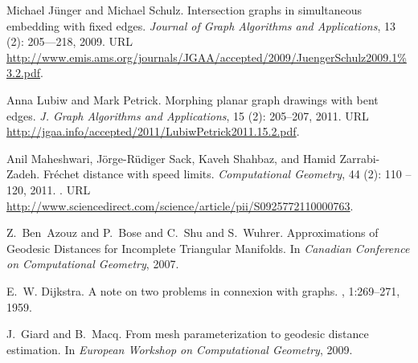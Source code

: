 \documentclass{patmorin}
\begin{document}
\begin{thebibliography}{1}
Michael J{\"u}nger and Michael Schulz.
\newblock Intersection graphs in simultaneous embedding with fixed edges.
\newblock \emph{Journal of Graph Algorithms and Applications}, 13
  (2): 205---218, 2009.
\newblock URL
  \url{http://www.emis.ams.org/journals/JGAA/accepted/2009/JuengerSchulz2009.1%
3.2.pdf}.

Anna Lubiw and Mark Petrick.
\newblock Morphing planar graph drawings with bent edges.
\newblock \emph{J. Graph Algorithms and Applications}, 15
  (2): 205--207, 2011.
\newblock URL \url{http://jgaa.info/accepted/2011/LubiwPetrick2011.15.2.pdf}.

Anil Maheshwari, J{\"o}rge-R{\"u}diger Sack, Kaveh Shahbaz, and Hamid
  Zarrabi-Zadeh.
\newblock Fr\'echet distance with speed limits.
\newblock \emph{Computational Geometry}, 44 (2): 110 -- 120,
  2011.
\newblock {}.
\newblock URL
  \url{http://www.sciencedirect.com/science/article/pii/S0925772110000763}.


Z.~Ben~Azouz and P.~Bose and C.~Shu and S.~Wuhrer.
\newblock Approximations of Geodesic Distances for Incomplete Triangular Manifolds.
\newblock In {\em Canadian Conference on Computational Geometry}, 2007.

E.~W. Dijkstra.
\newblock A note on two problems in connexion with graphs.
, 1:269--271, 1959.

J.~Giard and B.~Macq.
\newblock From mesh parameterization to geodesic distance estimation.
\newblock In {\em European Workshop on Computational Geometry}, 2009.
             
\end{thebibliography}
                 
\end{document}
